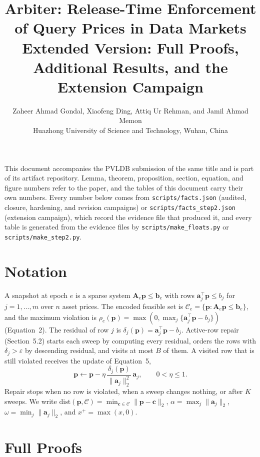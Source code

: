 \documentclass[10pt]{article}
\title{Arbiter: Release-Time Enforcement of Query Prices in Data Markets\\[4pt]
\large Extended Version: Full Proofs, Additional Results, and the Extension Campaign}
\author{Zaheer Ahmad Gondal, Xiaofeng Ding, Attiq Ur Rehman, and Jamil Ahmad Memon\\
Huazhong University of Science and Technology, Wuhan, China}
\date{}
\newcommand{\tol}{\varepsilon}
\newcommand{\pvec}{\mathbf{p}}
\newcommand{\Amat}{\mathbf{A}}
\newcommand{\bvec}{\mathbf{b}}
\newcommand{\avec}{\mathbf{a}}
\newcommand{\cvec}{\mathbf{c}}
\newcommand{\dist}{\mathrm{dist}}
\begin{document}
\maketitle

\noindent This document accompanies the PVLDB submission of the same title and is part of its artifact repository. Lemma, theorem, proposition, section, equation, and figure numbers refer to the paper, and the tables of this document carry their own numbers. Every number below comes from \texttt{scripts/facts.json} (audited, closure, hardening, and revision campaigns) or \texttt{scripts/facts\_step2.json} (extension campaign), which record the evidence file that produced it, and every table is generated from the evidence files by \texttt{scripts/make\_floats.py} or \texttt{scripts/make\_step2.py}.

\section{Notation}
A snapshot at epoch $e$ is a sparse system $\Amat_e\pvec \le \bvec_e$ with rows $\avec_j^{\top}\pvec \le b_j$ for $j = 1,\dots,m$ over $n$ asset prices. The encoded feasible set is $\mathcal{C}_e = \{\pvec : \Amat_e\pvec \le \bvec_e\}$, and the maximum violation is $\rho_e(\pvec) = \max(0, \max_j \{\avec_j^{\top}\pvec - b_j\})$ (Equation~2). The residual of row $j$ is $\delta_j(\pvec) = \avec_j^{\top}\pvec - b_j$. Active-row repair (Section~5.2) starts each sweep by computing every residual, orders the rows with $\delta_j > \tol$ by descending residual, and visits at most $B$ of them. A visited row that is still violated receives the update of Equation~5,
\begin{equation*}
\pvec \leftarrow \pvec - \eta\,\frac{\delta_j(\pvec)}{\lVert\avec_j\rVert_2^2}\,\avec_j, \qquad 0 < \eta \le 1 .
\end{equation*}
Repair stops when no row is violated, when a sweep changes nothing, or after $K$ sweeps. We write $\dist(\pvec,\mathcal{C}) = \min_{\cvec \in \mathcal{C}} \lVert\pvec - \cvec\rVert_2$, $\alpha = \max_j \lVert\avec_j\rVert_2$, $\omega = \min_j \lVert\avec_j\rVert_2$, and $x^{+} = \max(x, 0)$.

\section{Full Proofs}
\end{document}
